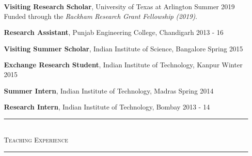 \documentclass[10pt]{article}
\begin{document}
\vspace{0.35em}
\textbf{Visiting Research Scholar}, {{University of Texas at Arlington}} \hfill \normalsize{Summer 2019}\\ 
Funded through the \emph{Rackham Research Grant Fellowship (2019)}.

\vspace{0.35em}
\textbf{Research Assistant}, {{Punjab Engineering College, Chandigarh}} \hfill 2013 - 16 %

\vspace{0.35em}
\textbf{Visiting Summer Scholar}, {{Indian Institute of Science, Bangalore}} \hfill Spring 2015 %

\vspace{0.35em}
\textbf{Exchange Research Student}, {{Indian Institute of Technology, Kanpur}} \hfill Winter 2015 %

\vspace{0.35em}
\textbf{Summer Intern}, {{Indian Institute of Technology, Madras}} \hfill Spring 2014 %

\vspace{0.35em}
\textbf{Research Intern}, {{Indian Institute of Technology, Bombay}} \hfill 2013 - 14 %

\vspace{-0.75em}


\begin{center}
{\noindent\rule[0.5ex]{\linewidth}{0.5pt}\\
\vspace{-0.5em}\large{\textsc{Teaching Experience}}
\\ \vspace{-0.25em}
\noindent\rule[0.5ex]{\linewidth}{0.5pt}}
\end{center}
\end{document}
